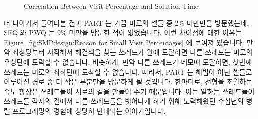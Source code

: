 \begin{figure}[tb]
\begin{center}
\end{center}
\caption{Correlation Between Visit Percentage and Solution Time}
\label{fig:SMPdesign:Correlation Between Visit Percentage and Solution Time}
\end{figure}

더 나아가서 들여다본 결과 PART 는 가끔 미로의 셀들 중 2\% 미만만을 방문했는데,
SEQ 와 PWQ 는 9\% 미만을 방문한 적이 없었습니다.
이런 차이점에 대한 이유는
Figure~\ref{fig:SMPdesign:Reason for Small Visit Percentages} 에 보여져
있습니다.
만약 좌상당부터 시작해서 해결책을 찾는 쓰레드가 원에 도달하면 다른 쓰레드는
미로의 우상단에 도락할 수 없습니다.
비슷하게, 만약 다른 쓰레드가 네모에 도달하면, 첫번째 쓰레드는 미로의 좌하단에
도착할 수 없습니다.
따라서, PART 는 해법이 아닌 셀들로 이루어진 경로 중 더 작은 부분만을 방문하게
될 것입니다.
한마디로, 선형을 초월하는 속도 향상은 쓰레드들이 서로의 길을 만들어 주기
때문입니다.
이는 일하는 쓰레드들이 쓰레드들 각자의 길에서 다른 쓰레드들을 벗어나게 하기
위해 노력해왔던 수십년의 병렬 프로그래밍의 경험에 상당히 반대되는 이야기입니다.

